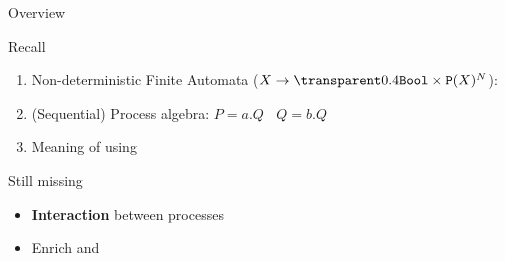 \documentclass[aspectratio=169]{beamer}
\begin{document}
\begin{slide}{Overview}

\begin{block}{Recall}
\begin{enumerate}
  \item Non-deterministic Finite Automata ($X \to \faded{\mathtt{Bool}} \times \mathtt{P}(X)^{\Act}$):
  \item (Sequential) Process algebra:
    $P = a.Q ~~~~ Q=b.Q$

  \item Meaning of  using 
\end{enumerate}  
\end{block}

\begin{block}{Still missing}
\begin{itemize}
  \item \alert{\textbf{Interaction}} between processes
  \item Enrich  and 
\end{itemize}
\end{block}

\end{slide}
\end{document}
